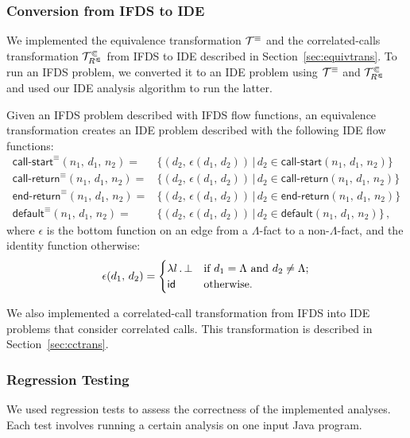 \begin{odelete}
\subsubsection{Conversion from IFDS to IDE}
We implemented the equivalence transformation $\mathcal T^\equiv$ and the correlated-calls transformation $\mathcal T^\Subset_{R^\Subset}$ from IFDS to IDE described in Section~\ref{sec:equivtrans}. To run an IFDS problem, we converted it to an IDE problem using $\mathcal T^\equiv$ and $\mathcal T^\Subset_{R^\Subset}$ and used our IDE analysis algorithm to run the latter.

Given an IFDS problem described with IFDS flow functions, an equivalence transformation creates an IDE problem described with the following IDE flow functions:
\begin{align*}
  \textsf{call-start}^\equiv(n_1,\,d_1,\,n_2)=&\{(d_2,\,\epsilon(d_1,\,d_2))\,|\,d_2\in\textsf{call-start}(n_1,\,d_1,\,n_2)\}\\
  \textsf{call-return}^\equiv(n_1,\,d_1,\,n_2)=&\{(d_2,\,\epsilon(d_1,\,d_2))\,|\,d_2\in\textsf{call-return}(n_1,\,d_1,\,n_2)\}\\
  \textsf{end-return}^\equiv(n_1,\,d_1,\,n_2)=&\{(d_2,\,\epsilon(d_1,\,d_2))\,|\,d_2\in\textsf{end-return}(n_1,\,d_1,\,n_2)\}\\
  \textsf{default}^\equiv(n_1,\,d_1,\,n_2)=&\{(d_2,\,\epsilon(d_1,\,d_2))\,|\,d_2\in\textsf{default}(n_1,\,d_1,\,n_2)\}\,,
\end{align*}
where $\epsilon$ is the bottom function on an edge from a $\Lambda$-fact to a non-$\Lambda$-fact, and the identity function otherwise:
\[
  \epsilon(d_1,\,d_2)=\begin{cases}
    \lambda l\,.\,\bot&\text{if $d_1=\Lambda$ and $d_2\ne\Lambda$;}\\
    \textsf{id}&\text{otherwise.}
  \end{cases}
\]

We also implemented a correlated-call transformation from IFDS into IDE problems that consider correlated calls. This transformation is described in Section~\ref{sec:cctrans}.
\end{odelete}

\subsubsection{Regression Testing}
We used regression tests to assess the correctness of the implemented analyses. Each test involves running a certain analysis on one input Java program.

